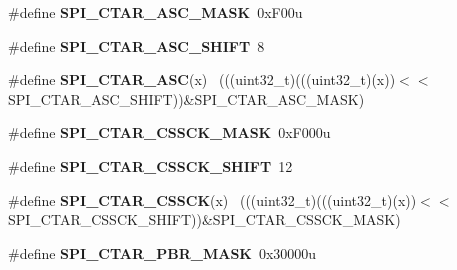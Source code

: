 \begin{DoxyCompactItemize}
\item 
\hypertarget{group___s_p_i___register___masks_gad15c92f5474cc1ba1ca2af14c92cbf26}{}\#define {\bfseries S\+P\+I\+\_\+\+C\+T\+A\+R\+\_\+\+A\+S\+C\+\_\+\+M\+A\+S\+K}~0x\+F00u\label{group___s_p_i___register___masks_gad15c92f5474cc1ba1ca2af14c92cbf26}

\item 
\hypertarget{group___s_p_i___register___masks_gadbf91ef3bf1d4943ab782ff027d121bd}{}\#define {\bfseries S\+P\+I\+\_\+\+C\+T\+A\+R\+\_\+\+A\+S\+C\+\_\+\+S\+H\+I\+F\+T}~8\label{group___s_p_i___register___masks_gadbf91ef3bf1d4943ab782ff027d121bd}

\item 
\hypertarget{group___s_p_i___register___masks_ga6d9f16d5f0d5a66e6c217d43dea5953f}{}\#define {\bfseries S\+P\+I\+\_\+\+C\+T\+A\+R\+\_\+\+A\+S\+C}(x)                                                ~(((uint32\+\_\+t)(((uint32\+\_\+t)(x))$<$$<$S\+P\+I\+\_\+\+C\+T\+A\+R\+\_\+\+A\+S\+C\+\_\+\+S\+H\+I\+F\+T))\&S\+P\+I\+\_\+\+C\+T\+A\+R\+\_\+\+A\+S\+C\+\_\+\+M\+A\+S\+K)\label{group___s_p_i___register___masks_ga6d9f16d5f0d5a66e6c217d43dea5953f}

\item 
\hypertarget{group___s_p_i___register___masks_ga5c824276fa48ae7b05fc922d20d237c0}{}\#define {\bfseries S\+P\+I\+\_\+\+C\+T\+A\+R\+\_\+\+C\+S\+S\+C\+K\+\_\+\+M\+A\+S\+K}~0x\+F000u\label{group___s_p_i___register___masks_ga5c824276fa48ae7b05fc922d20d237c0}

\item 
\hypertarget{group___s_p_i___register___masks_gaf4e35373d2e9149e1c73f9b65887ad37}{}\#define {\bfseries S\+P\+I\+\_\+\+C\+T\+A\+R\+\_\+\+C\+S\+S\+C\+K\+\_\+\+S\+H\+I\+F\+T}~12\label{group___s_p_i___register___masks_gaf4e35373d2e9149e1c73f9b65887ad37}

\item 
\hypertarget{group___s_p_i___register___masks_gaae5d1ed90890f6ecb4dc23e79dcb8473}{}\#define {\bfseries S\+P\+I\+\_\+\+C\+T\+A\+R\+\_\+\+C\+S\+S\+C\+K}(x)                                            ~(((uint32\+\_\+t)(((uint32\+\_\+t)(x))$<$$<$S\+P\+I\+\_\+\+C\+T\+A\+R\+\_\+\+C\+S\+S\+C\+K\+\_\+\+S\+H\+I\+F\+T))\&S\+P\+I\+\_\+\+C\+T\+A\+R\+\_\+\+C\+S\+S\+C\+K\+\_\+\+M\+A\+S\+K)\label{group___s_p_i___register___masks_gaae5d1ed90890f6ecb4dc23e79dcb8473}

\item 
\hypertarget{group___s_p_i___register___masks_ga4f40ea2ab0d14559523ab0699fd682c6}{}\#define {\bfseries S\+P\+I\+\_\+\+C\+T\+A\+R\+\_\+\+P\+B\+R\+\_\+\+M\+A\+S\+K}~0x30000u\label{group___s_p_i___register___masks_ga4f40ea2ab0d14559523ab0699fd682c6}


\end{DoxyCompactItemize}

